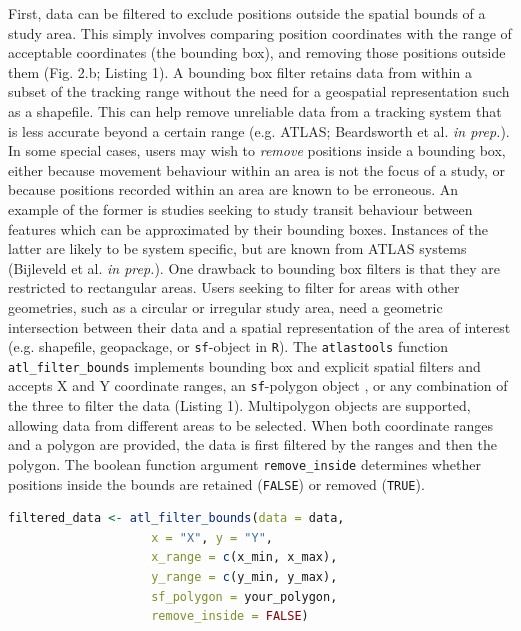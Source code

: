 \documentclass[10pt,paper=a4,headings=standardclasses
]{scrartcl}
\begin{document}
First, data can be filtered to exclude positions outside the spatial bounds of a study area.
This simply involves comparing position coordinates with the range of acceptable coordinates (the bounding box), and removing those positions outside them (Fig. 2.b; Listing 1). 
A bounding box filter retains data from within a subset of the tracking range without the need for a geospatial representation such as a shapefile.
This can help remove unreliable data from a tracking system that is less accurate beyond a certain range (e.g. ATLAS; Beardsworth et al. \textit{in prep.}).
In some special cases, users may wish to \textit{remove} positions inside a bounding box, either because movement behaviour within an area is not the focus of a study, or because positions recorded within an area are known to be erroneous.
An example of the former is studies seeking to study transit behaviour between features which can be approximated by their bounding boxes. 
Instances of the latter are likely to be system specific, but are known from ATLAS systems (Bijleveld et al. \textit{in prep.}). 
One drawback to bounding box filters is that they are restricted to rectangular areas.
Users seeking to filter for areas with other geometries, such as a circular or irregular study area, need a geometric intersection between their data and a spatial representation of the area of interest (e.g. shapefile, geopackage, or \texttt{sf}-object in \texttt{R}).
The \texttt{atlastools} function \texttt{atl\_filter\_bounds} implements bounding box and explicit spatial filters and accepts X and Y coordinate ranges, an \texttt{sf}-polygon object \citep{pebesma2018}, or any combination of the three to filter the data (Listing 1).
Multipolygon objects are supported, allowing data from different areas to be selected.
When both coordinate ranges and a polygon are provided, the data is first filtered by the ranges and then the polygon.
The boolean function argument \texttt{remove\_inside} determines whether positions inside the bounds are retained (\texttt{FALSE}) or removed (\texttt{TRUE}).

\begin{lstlisting}[float,floatplacement=h!,language=R, style=customR, caption = {
    The \texttt{atl\_filter\_bounds} function removes positions outside an area defined by coordinate ranges, a polygon, or all three (\texttt{remove\_inside = FALSE}), or positions inside the area (\texttt{remove\_inside = TRUE}).
    The arguments \texttt{x} and \texttt{y} determine which columns are considered the X and Y coordinates, the arguments \texttt{x\_range} and \texttt{y\_range} determine the acceptable range of coordinates in a reference system based in metres, while the \texttt{sf\_polygon} argument allows the data to be filtered by the user specified \texttt{sf-(MULTI)POLYGON} object. 
    \texttt{atl\_filter\_bounds} returns a filtered \texttt{data.table}, which must be saved as an object (here, \texttt{filtered\_data}).}]
filtered_data <- atl_filter_bounds(data = data,
                    x = "X", y = "Y",
                    x_range = c(x_min, x_max),
                    y_range = c(y_min, y_max),
                    sf_polygon = your_polygon,
                    remove_inside = FALSE)
\end{lstlisting}
\end{document}
